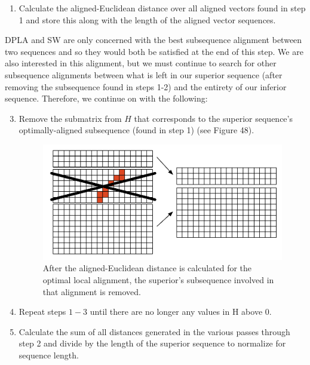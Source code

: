 \documentclass[12pt]{report} 	%
\numberwithin{figure}{chapter}
\numberwithin{table}{chapter}
\numberwithin{equation}{chapter}
\begin{document}
\begin{flushleft}
\begin{enumerate}
\item Calculate the aligned-Euclidean distance over all aligned vectors found in step 1 and store this along with the length of the aligned vector sequences.
\end{enumerate}
DPLA and SW are only concerned with the best subsequence alignment between two sequences and so they would both be satisfied at the end of this step. We are also interested in this alignment, but we must continue to search for other subsequence alignments between what is left in our superior sequence (after removing the subsequence found in steps 1-2) and the entirety of our inferior sequence. Therefore, we continue on with the following:
\begin{enumerate}
\setcounter{enumi}{2}
\item Remove the submatrix from $H$ that corresponds to the superior sequence's optimally-aligned subsequence (found in step 1) (see Figure 48).
\begin{figure}[h!]
\begin{center}
\includegraphics[scale=0.8]{SIC-DPLA_2}
\caption[Removing the optimal subsequence]{After the aligned-Euclidean distance is calculated for the optimal local alignment, the superior's subsequence involved in that alignment is removed.}
\end{center}
\end{figure}
\item Repeat steps $1-3$ until there are no longer any values in H above 0.
\item Calculate the sum of all distances generated in the various passes through step 2 and divide by the length of the superior sequence to normalize for sequence length.
\end{enumerate}


\end{flushleft}
\end{document}
